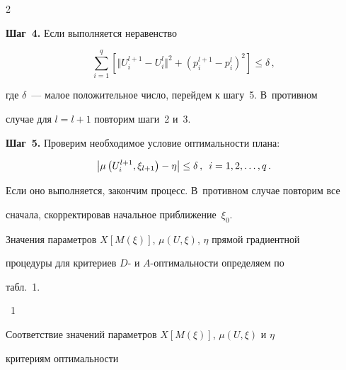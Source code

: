 \begin{multicols}{2}
  \smallskip





\textbf{Шаг~4.} Если выполняется неравенство


  $$


  \sum\limits^q_{i=1}\left[ \Vert U_i^{l+1}-U_i^l\Vert^2+\left( p_i^{l+1}-


p_i^l\right)^2\right]\leq \delta\,,


  $$


где $\delta$~--- малое положительное число, перейдем к шагу~5. В~противном


случае для $l=l+1$ повторим шаги~2 и~3.





  \smallskip





\textbf{Шаг~5.} Проверим необходимое условие оптимальности плана:


  $$


  \left\vert \mu \left( U_i^{l+1},\xi_{l+1}\right) -\eta\right\vert \leq \delta\,,\enskip


i=1,2, \ldots , q\,.


  $$


Если оно выполняется, закончим процесс. В~противном случае повторим все


сначала, скорректировав начальное приближение~$\xi_0$.





  Значения параметров $X[M(\xi)]$, $\mu(U,\xi)$, $\eta$ прямой градиентной


процедуры для критериев $D$- и $A$-оп\-ти\-маль\-ности определяем по


табл.~1.





  \noindent


\begin{center} %


\parbox{80mm}{{\tablename~1}\ \ \small{Соответствие значений параметров $X[M(\xi)]$, $\mu(U,\xi)$ и $\eta$


  критериям оптимальности}}







\vspace*{2ex}



\end{center}
\end{multicols}

